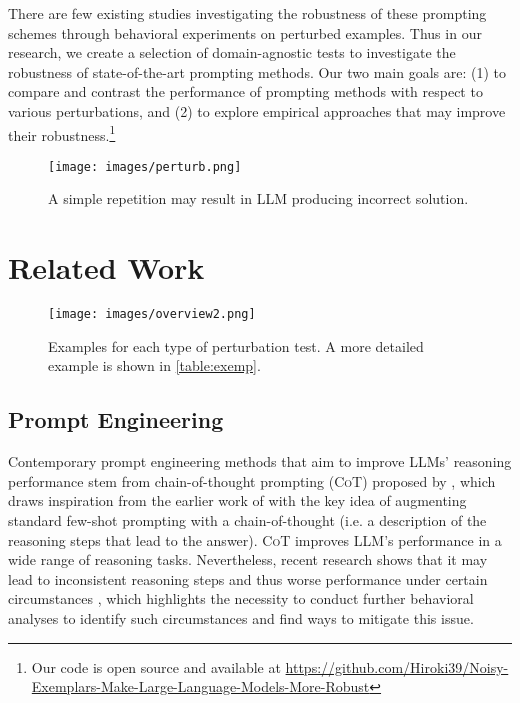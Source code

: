 \documentclass[11pt]{article}
\begin{document}
There are few existing studies investigating the robustness of these prompting schemes through behavioral experiments on perturbed examples. Thus in our research, we create a selection of domain-agnostic tests to investigate the robustness of state-of-the-art prompting methods. Our two main goals are: (1) to compare and contrast the performance of prompting methods with respect to various perturbations, and (2) to explore empirical approaches that may improve their robustness.\footnote{Our code is open source and available at \url{https://github.com/Hiroki39/Noisy-Exemplars-Make-Large-Language-Models-More-Robust}}

\begin{figure}[t]
    \centering\captionsetup{justification=centering}
    \texttt{[image: images/perturb.png]}
    \caption{A simple repetition may result in LLM producing incorrect solution.}
    \label{fig:perturb}
\end{figure}

\section{Related Work}

\begin{figure*}[t]
    \centering
    \captionsetup{justification=centering}
    \texttt{[image: images/overview2.png]}
    \caption{Examples for each type of perturbation test. A more detailed example is shown in \autoref{table:exemp}.}
    \label{fig:overview}
\end{figure*}

\subsection{Prompt Engineering}

Contemporary prompt engineering methods that aim to improve LLMs' reasoning performance stem from chain-of-thought prompting (\textsc{CoT}) proposed by \citet{wei2023chainofthought}, which draws inspiration from the earlier work of \citet{ling-etal-2017-program} with the key idea of augmenting standard few-shot prompting with a chain-of-thought (i.e. a description of the reasoning steps that lead to the answer). \textsc{CoT} improves LLM's performance in a wide range of reasoning tasks. Nevertheless, recent research shows that it may lead to inconsistent reasoning steps and thus worse performance under certain circumstances \cite{ye2022the}, which highlights the necessity to conduct further behavioral analyses to identify such circumstances and find ways to mitigate this issue.
\end{document}
